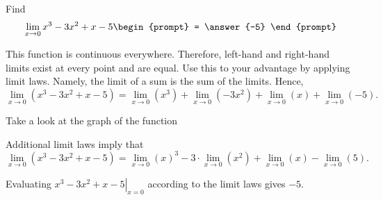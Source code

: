 \documentclass{ximera}
\author{Gregory Hartman \and Matthew Carr}
\begin{document}
\begin{exercise}



  Find 
  \[
  \displaystyle \lim_{x\to 0} x^3-3x^2+x-5
  \begin{prompt}
  = \answer{-5}
  \end{prompt}
  \]
    \begin{hint}
      This function is continuous everywhere. Therefore, left-hand and right-hand limits exist at every point and are equal. Use this to your advantage by applying limit laws. Namely, the limit of a sum is the sum of the limits. Hence, 
    \[
    \lim_{x\to 0} \left( x^3-3x^2+x-5 \right)  
    = \lim_{x\to 0} \left( x^3 \right) +
    \lim_{x\to 0} \left( -3x^2 \right) +
    \lim_{x\to 0} \left( x \right) +
    \lim_{x\to 0} \left(-5\right).
    \]

    \end{hint}
     \begin{hint}
    Take a look at the graph of the function
    \begin{center}
      \end{center}
    \end{hint}
    Additional limit laws imply that
    \[
    \lim_{x\to 0} \left( x^3-3x^2+x-5 \right)  
    = \lim_{x\to 0} \left( x \right)^3 -
    3\cdot\lim_{x\to 0} \left( x^2 \right) +
    \lim_{x\to 0} \left( x \right) -
    \lim_{x\to 0} \left(5\right).
    \]
    \begin{hint}
     Evaluating $\left.x^3-3x^2+x-5\right|_{x=0}$ according to the limit laws gives $-5$.
     \end{hint}
    
\end{exercise}
\end{document}
